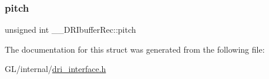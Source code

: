 \mbox{\label{struct_____d_r_ibuffer_rec_a3ca39b391b5c70991eceecfe24680d01}} 
\subsubsection{\texorpdfstring{pitch}{pitch}}
{\footnotesize\ttfamily unsigned int \+\_\+\+\_\+\+D\+R\+Ibuffer\+Rec\+::pitch}



The documentation for this struct was generated from the following file\+:\begin{DoxyCompactItemize}
\item 
G\+L/internal/\hyperlink{dri__interface_8h}{dri\+\_\+interface.\+h}\end{DoxyCompactItemize}
